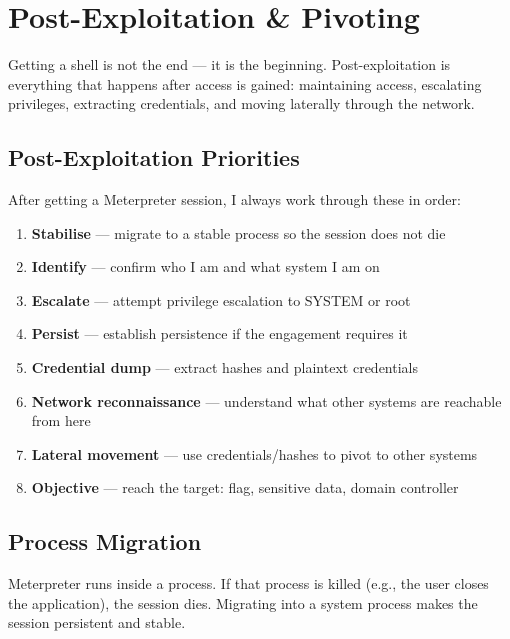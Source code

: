 \chapter{Post-Exploitation \& Pivoting}
\label{ch:post_exploitation}

Getting a shell is not the end --- it is the beginning. Post-exploitation is
everything that happens after access is gained: maintaining access, escalating
privileges, extracting credentials, and moving laterally through the network.

\section{Post-Exploitation Priorities}
\label{sec:post_priorities}

After getting a Meterpreter session, I always work through these in order:

\begin{enumerate}
  \item \textbf{Stabilise} --- migrate to a stable process so the session does
        not die
  \item \textbf{Identify} --- confirm who I am and what system I am on
  \item \textbf{Escalate} --- attempt privilege escalation to SYSTEM or root
  \item \textbf{Persist} --- establish persistence if the engagement requires it
  \item \textbf{Credential dump} --- extract hashes and plaintext credentials
  \item \textbf{Network reconnaissance} --- understand what other systems are
        reachable from here
  \item \textbf{Lateral movement} --- use credentials/hashes to pivot to other
        systems
  \item \textbf{Objective} --- reach the target: flag, sensitive data, domain
        controller
\end{enumerate}

\section{Process Migration}
\label{sec:process_migration}

Meterpreter runs inside a process. If that process is killed (e.g., the user
closes the application), the session dies. Migrating into a system process
makes the session persistent and stable.

